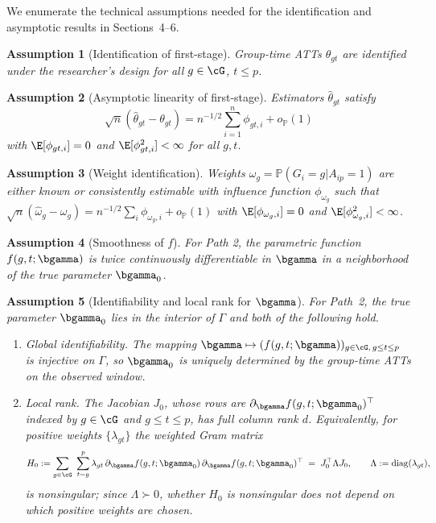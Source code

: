 \documentclass{article}
\newtheorem{assumption}{Assumption}
\renewcommand{\P}{\mathbb{P}}
\begin{document}
We enumerate the technical assumptions needed for the identification and asymptotic results in Sections~4--6.

\begin{assumption}[Identification of first-stage]\label{RC1}
Group-time ATTs $\theta_{gt}$ are identified under the researcher's design for all $g \in \cG$, $t \leq p$.
\end{assumption}

\begin{assumption}[Asymptotic linearity of first-stage]\label{RC2}
Estimators $\widehat{\theta}_{gt}$ satisfy
\[
\sqrt{n}(\widehat{\theta}_{gt} - \theta_{gt}) = n^{-1/2}\sum_{i=1}^n \phi_{gt,i} + o_{\P}(1)
\]
with $\E[\phi_{gt,i}] = 0$ and $\E[\phi_{gt,i}^2] < \infty$ for all $g,t$.
\end{assumption}

\begin{assumption}[Weight identification]\label{RC3}
Weights $\omega_g = \P(G_i = g | A_{ip} = 1)$ are either known or consistently estimable with influence function $\phi_{\omega_g}$ such that $\sqrt{n}(\widehat{\omega}_g - \omega_g) = n^{-1/2}\sum_i \phi_{\omega_g,i} + o_{\P}(1)$ with $\E[\phi_{\omega_g,i}] = 0$ and $\E[\phi_{\omega_g,i}^2] < \infty$.
\end{assumption}

\begin{assumption}[Smoothness of $f$]\label{RC4}
For Path 2, the parametric function $f(g,t;\bgamma)$ is twice continuously differentiable in $\bgamma$ in a neighborhood of the true parameter $\bgamma_0$.
\end{assumption}

\begin{assumption}[Identifiability and local rank for $\bgamma$]\label{RC5}
For Path~2, the true parameter $\bgamma_0$ lies in the interior of $\Gamma$ and both of the following hold.
\begin{enumerate}
\item[(i)] \emph{Global identifiability.} The mapping $\bgamma \mapsto (f(g,t;\bgamma))_{g \in \cG,\, g \leq t \leq p}$ is injective on $\Gamma$, so $\bgamma_0$ is uniquely determined by the group-time ATTs on the observed window.
\item[(ii)] \emph{Local rank.} The Jacobian $J_0$, whose rows are $\partial_{\bgamma} f(g,t;\bgamma_0)^{\top}$ indexed by $g \in \cG$ and $g \leq t \leq p$, has full column rank $d$. Equivalently, for positive weights $\{\lambda_{gt}\}$ the weighted Gram matrix
\[
H_0 := \sum_{g \in \cG}\ \sum_{t=g}^{p} \lambda_{gt}\, \partial_{\bgamma} f(g,t;\bgamma_0)\, \partial_{\bgamma} f(g,t;\bgamma_0)^{\top} \;=\; J_0^{\top}\Lambda J_0, \qquad \Lambda := \mathrm{diag}(\lambda_{gt}),
\]
is nonsingular; since $\Lambda \succ 0$, whether $H_0$ is nonsingular does not depend on which positive weights are chosen.
\end{enumerate}
\end{assumption}
\end{document}
